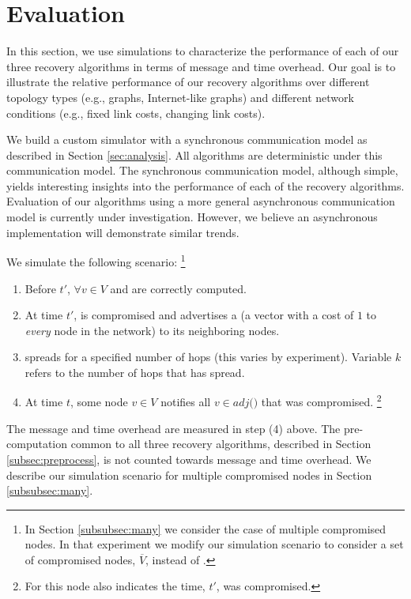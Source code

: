 \section{Evaluation}
\label{sec:eval}

In this section, we use simulations to characterize the performance of each of our three recovery algorithms in terms of message and time overhead. 
Our goal is to illustrate the relative performance of our recovery algorithms over different topology types (e.g., \er graphs, Internet-like graphs) and
different network conditions (e.g., fixed link costs, changing link costs).


We build a custom simulator with a synchronous communication model as described in Section \ref{sec:analysis}. All algorithms
are deterministic under this communication model.
The synchronous communication model, although simple, yields
interesting insights into the performance of each of the recovery
algorithms. Evaluation of our algorithms using a more general
asynchronous communication model is currently under
investigation. However, we believe an asynchronous implementation
will demonstrate similar trends.  

We simulate the following scenario: 
{\footnote {\small In Section \ref{subsubsec:many} we consider the case of multiple compromised nodes.  In that experiment we modify our simulation scenario
to consider a set of compromised nodes, $\overline{V}$, instead of \bads.}}
\begin{enumerate}
	\item Before $t'$, $\forall v \in V$ \minvv and \dmatrixv are correctly computed.

	\item At time $t'$, \bad is compromised and advertises a \badvector (a vector with a cost of $1$ to \emph{every} node in the network) to its neighboring nodes.

	\item \badvector spreads for a specified number of hops (this varies by experiment).  Variable $k$ refers to the number of hops that \badvector has spread.

	\item At time $t$, some node $v \in V$ notifies all $v \in adj($\bads$)$ that \bad was compromised. 
	{\footnote { \small For \cpr this node also indicates the time, $t'$, \bad was compromised.}} 

\end{enumerate}
The message and time overhead are measured in step (4) above. The pre-computation common to all three recovery algorithms, described in Section \ref{subsec:preprocess},
is not counted towards message and time overhead. We describe our simulation scenario for multiple compromised nodes in Section \ref{subsubsec:many}.


